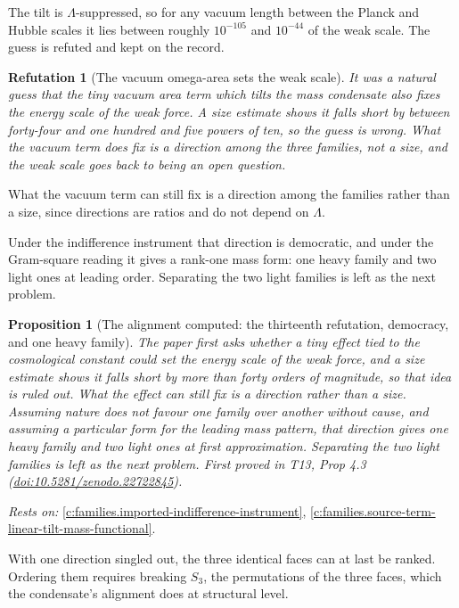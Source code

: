 \documentclass[11pt]{article}
\newtheorem{proposition}[theorem]{Proposition}
\newtheorem{refutation}[theorem]{Refutation}
\theoremstyle{definition}
\theoremstyle{plain}
\begin{document}
The tilt is $\Lambda$-suppressed, so for any vacuum length between the Planck and Hubble scales it lies between roughly $10^{-105}$ and $10^{-44}$ of the weak scale. The guess is refuted and kept on the record.

\begin{refutation}[The vacuum omega-area sets the weak scale]\label{c:refuted.the-vacuum-omega-area-sets-the-weak-scale}
It was a natural guess that the tiny vacuum area term which tilts the mass condensate also fixes the energy scale of the weak force. A size estimate shows it falls short by between forty-four and one hundred and five powers of ten, so the guess is wrong. What the vacuum term does fix is a direction among the three families, not a size, and the weak scale goes back to being an open question.
\end{refutation}

What the vacuum term can still fix is a direction among the families rather than a size, since directions are ratios and do not depend on $\Lambda$.

Under the indifference instrument that direction is democratic, and under the Gram-square reading it gives a rank-one mass form: one heavy family and two light ones at leading order. Separating the two light families is left as the next problem.

\begin{proposition}[The alignment computed: the thirteenth refutation, democracy, and one heavy family]\label{c:families.alignment-computed-thirteenth-refutation-democracy-one}
The paper first asks whether a tiny effect tied to the cosmological constant could set the energy scale of the weak force, and a size estimate shows it falls short by more than forty orders of magnitude, so that idea is ruled out. What the effect can still fix is a direction rather than a size. Assuming nature does not favour one family over another without cause, and assuming a particular form for the leading mass pattern, that direction gives one heavy family and two light ones at first approximation. Separating the two light families is left as the next problem.
\emph{First proved in} T13, Prop 4.3 (\href{https://doi.org/10.5281/zenodo.22722845}{doi:10.5281/zenodo.22722845}).
\end{proposition}
\noindent\emph{Rests on:} \ref{c:families.imported-indifference-instrument}, \ref{c:families.source-term-linear-tilt-mass-functional}.

With one direction singled out, the three identical faces can at last be ranked. Ordering them requires breaking $S_{3}$, the permutations of the three faces, which the condensate's alignment does at structural level.
\end{document}
